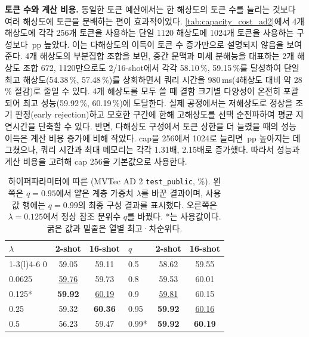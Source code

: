 \noindent\textbf{토큰 수와 계산 비용.}
동일한 토큰 예산에서는 한 해상도의 토큰 수를 늘리는 것보다 여러 해상도에 토큰을 분배하는 편이 효과적이었다. \cref{tab:capacity_cost_ad2}에서 4개 해상도에 각각 256개 토큰을 사용하는  단일 1120 해상도에 1024개 토큰을 사용하는 구성보다 \,pp 높았다. 이는 다해상도의 이득이 토큰 수 증가만으로 설명되지 않음을 보여준다.
4개 해상도의 부분집합 조합을 보면, 중간 문맥과 미세 분해능을 대표하는 2개 해상도 조합 {672, 1120}만으로도 2/16-shot에서 각각 58.10\,\%, 59.15\,\%를 달성하여 단일 최고 해상도(54.38\,\%, 57.48\,\%)를 상회하면서 쿼리 시간을 980\,ms(4해상도 대비 약 28\,\% 절감)로 줄일 수 있다. 4개 해상도를 모두 쓸 때 결함 크기별 다양성이 온전히 포괄되어 최고 성능(59.92\,\%, 60.19\,\%)에 도달한다. 실제 공정에서는 저해상도로 정상을 조기 판정(early rejection)하고 모호한 구간에 한해 고해상도를 선택 순전파하여 평균 지연시간을 단축할 수 있다.
반면, 다해상도 구성에서 토큰 상한을 더 늘렸을 때의 성능 이득은 계산 비용 증가에 비해 작았다. cap을 256에서 1024로 늘리면 \,pp 높아지는 데 그쳤으나, 쿼리 시간과 최대 메모리는 각각 1.31배, 2.15배로 증가했다. 따라서 성능과 계산 비용을 고려해 cap 256을 기본값으로 사용한다.

\begin{table}[!t]
\centering\scriptsize\setlength{\tabcolsep}{3.5pt}
\caption{하이퍼파라미터에 따른 \AUPRO{} (MVTec AD 2 \texttt{test\_public}, \%). 왼쪽은 $q=0.95$에서 얕은 계층 가중치 $\lambda$를 바꾼 결과이며, 사용값 행에는 $q=0.99$의 최종 구성 결과를 표시했다. 오른쪽은 $\lambda=0.125$에서 정상 참조 분위수 $q$를 바꿨다. *는 사용값이다. 굵은 값과 밑줄은 열별 최고·차순위다.}
\label{tab:lambda_final}
\renewcommand{\arraystretch}{1.12}
\begin{tabular*}{\columnwidth}{@{\extracolsep{\fill}}lcclcc}
\toprule
$\lambda$ & 2-shot & 16-shot & $q$ & 2-shot & 16-shot \\
\cmidrule(r){1-3}\cmidrule(l){4-6}
0 & 59.05 & 59.11 & 0.5 & 58.62 & 59.55 \\
0.0625 & \underline{59.76} & 59.73 & 0.8 & 59.53 & 60.01 \\
0.125* & \textbf{59.92} & \underline{60.19} & 0.9 & \underline{59.81} & 60.15 \\
0.25 & 59.32 & \textbf{60.36} & 0.95 & \textbf{59.92} & \underline{60.16} \\
0.5 & 56.23 & 59.47 & 0.99* & \textbf{59.92} & \textbf{60.19} \\
\bottomrule
\end{tabular*}
\end{table}


